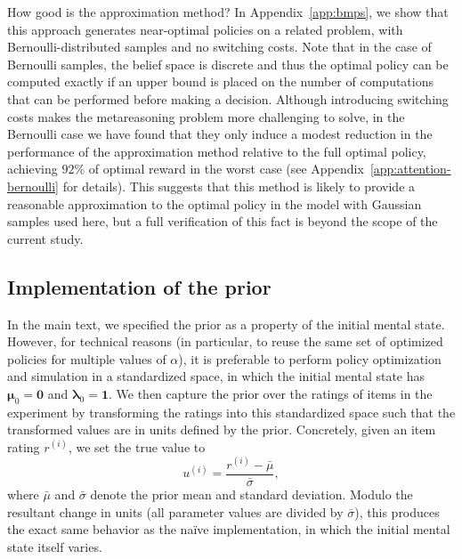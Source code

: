 How good is the approximation method? In Appendix~\ref{app:bmps}, we show that this approach generates near-optimal policies on a related problem, with Bernoulli-distributed samples and no switching costs. Note that in the case of Bernoulli samples, the belief space is discrete and thus the optimal policy can be computed exactly if an upper bound is placed on the number of computations that can be performed before making a decision. Although introducing switching costs makes the metareasoning problem more challenging to solve, in the Bernoulli case we have found that they only induce a modest reduction in the performance of the approximation method relative to the full optimal policy, achieving $92\%$ of optimal reward in the worst case (see Appendix~\ref{app:attention-bernoulli} for details). This suggests that this method is likely to provide a reasonable approximation to the optimal policy in the model with Gaussian samples used here, but a full verification of this fact is beyond the scope of the current study.


\subsection{Implementation of the prior}

In the main text, we specified the prior as a property of the initial mental state. However, for technical reasons (in particular, to reuse the same set of optimized policies for multiple values of $\alpha$), it is preferable to perform policy optimization and simulation in a standardized space, in which the initial mental state has $\mathbf{\mu}_0 = \mathbf{0}$ and $\mathbf{\lambda}_0 = \mathbf{1}$. We then capture the prior over the ratings of items in the experiment by transforming the ratings into this standardized space such that the transformed values are in units defined by the prior. Concretely, given an item rating $r^{(i)}$, we set the true value to
\begin{equation}\label{eq:rating-value}
  u^{(i)} = \frac{r^{(i)} - \bar{\mu}}{\bar{\sigma}},
\end{equation}
where $\bar{\mu}$ and $\bar{\sigma}$ denote the prior mean and standard deviation. 
Modulo the resultant change in units (all parameter values are divided by $\bar{\sigma}$), this produces the exact same behavior as the na\"ive implementation, in which the initial mental state itself varies. 

